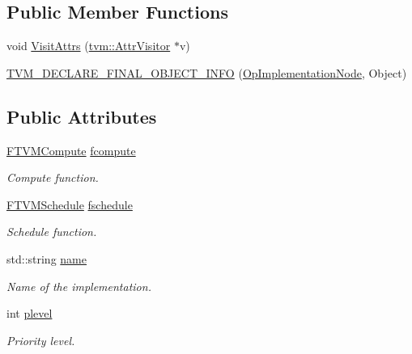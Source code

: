 \subsection*{Public Member Functions}
\begin{DoxyCompactItemize}
\item 
void \hyperlink{classtvm_1_1relay_1_1OpImplementationNode_a2e2f60b2a9661dfe0d599ec9f3a06580}{Visit\+Attrs} (\hyperlink{classtvm_1_1AttrVisitor}{tvm\+::\+Attr\+Visitor} $\ast$v)
\item 
\hyperlink{classtvm_1_1relay_1_1OpImplementationNode_a959fa0b0a598365aaa7c53b3170fe47e}{T\+V\+M\+\_\+\+D\+E\+C\+L\+A\+R\+E\+\_\+\+F\+I\+N\+A\+L\+\_\+\+O\+B\+J\+E\+C\+T\+\_\+\+I\+N\+FO} (\hyperlink{classtvm_1_1relay_1_1OpImplementationNode}{Op\+Implementation\+Node}, Object)
\end{DoxyCompactItemize}
\subsection*{Public Attributes}
\begin{DoxyCompactItemize}
\item 
\hyperlink{namespacetvm_1_1relay_a63a0893a8379998657ddff39a3162188}{F\+T\+V\+M\+Compute} \hyperlink{classtvm_1_1relay_1_1OpImplementationNode_abfdaa2a28cce000f920ef0c0cfed7e31}{fcompute}
\begin{DoxyCompactList}\small\item\em Compute function. \end{DoxyCompactList}\item 
\hyperlink{namespacetvm_1_1relay_af8f7c5928c79389da637c35df6c8557c}{F\+T\+V\+M\+Schedule} \hyperlink{classtvm_1_1relay_1_1OpImplementationNode_a53fd916957cb15e070d736d12d8ced62}{fschedule}
\begin{DoxyCompactList}\small\item\em Schedule function. \end{DoxyCompactList}\item 
std\+::string \hyperlink{classtvm_1_1relay_1_1OpImplementationNode_a25ff3bdfe97d3a8655aff45017a28610}{name}
\begin{DoxyCompactList}\small\item\em Name of the implementation. \end{DoxyCompactList}\item 
int \hyperlink{classtvm_1_1relay_1_1OpImplementationNode_af7afc9d22e58ead1fc342808ed0c4304}{plevel}
\begin{DoxyCompactList}\small\item\em Priority level. \end{DoxyCompactList}\end{DoxyCompactItemize}
